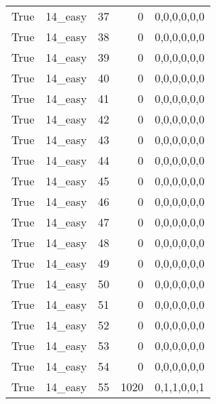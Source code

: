 \begin{tabular}{llrrl}
 True            & 14\_easy             &            37 &                     0 & 0,0,0,0,0,0   \\
 True            & 14\_easy             &            38 &                     0 & 0,0,0,0,0,0   \\
 True            & 14\_easy             &            39 &                     0 & 0,0,0,0,0,0   \\
 True            & 14\_easy             &            40 &                     0 & 0,0,0,0,0,0   \\
 True            & 14\_easy             &            41 &                     0 & 0,0,0,0,0,0   \\
 True            & 14\_easy             &            42 &                     0 & 0,0,0,0,0,0   \\
 True            & 14\_easy             &            43 &                     0 & 0,0,0,0,0,0   \\
 True            & 14\_easy             &            44 &                     0 & 0,0,0,0,0,0   \\
 True            & 14\_easy             &            45 &                     0 & 0,0,0,0,0,0   \\
 True            & 14\_easy             &            46 &                     0 & 0,0,0,0,0,0   \\
 True            & 14\_easy             &            47 &                     0 & 0,0,0,0,0,0   \\
 True            & 14\_easy             &            48 &                     0 & 0,0,0,0,0,0   \\
 True            & 14\_easy             &            49 &                     0 & 0,0,0,0,0,0   \\
 True            & 14\_easy             &            50 &                     0 & 0,0,0,0,0,0   \\
 True            & 14\_easy             &            51 &                     0 & 0,0,0,0,0,0   \\
 True            & 14\_easy             &            52 &                     0 & 0,0,0,0,0,0   \\
 True            & 14\_easy             &            53 &                     0 & 0,0,0,0,0,0   \\
 True            & 14\_easy             &            54 &                     0 & 0,0,0,0,0,0   \\
 True            & 14\_easy             &            55 &                  1020 & 0,1,1,0,0,1   \\

\end{tabular}
